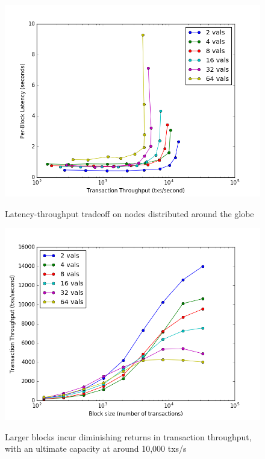 \begin{figure}[]
	\includegraphics[width=\linewidth,height=\textheight,keepaspectratio]{figures/throughput/latency-throughput.png}
    	\centering
	\label{fig:exp:throughput_latency}
	\caption[Latency-throughput in non-faulty network]{Latency-throughput tradeoff on nodes distributed around the globe}
\end{figure}
\begin{figure}[]
	\includegraphics[width=\linewidth,height=\textheight,keepaspectratio]{figures/throughput/throughput-blocksize.png}
    	\centering
	\label{fig:exp:throughput_blocksize}
	\caption[Throughput-blocksize in non-faulty network]{Larger blocks incur diminishing returns in transaction throughput, with an ultimate capacity at around 10,000 txs/s}
\end{figure}
